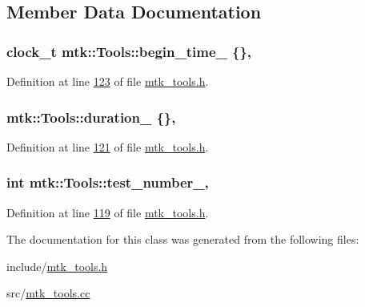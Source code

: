 \subsection{Member Data Documentation}
\hypertarget{classmtk_1_1Tools_a4bd58d08397db42271ed9e2d3ecc9963}{
\subsubsection[{begin\+\_\+time\+\_\+}]{\setlength{\rightskip}{0pt plus 5cm}clock\+\_\+t mtk\+::\+Tools\+::begin\+\_\+time\+\_\+ \{\}\hspace{0.3cm}{\ttfamily [static]}, {\ttfamily [private]}}}\label{classmtk_1_1Tools_a4bd58d08397db42271ed9e2d3ecc9963}


Definition at line \hyperlink{mtk__tools_8h_source_l00123}{123} of file \hyperlink{mtk__tools_8h_source}{mtk\+\_\+tools.\+h}.

\hypertarget{classmtk_1_1Tools_aba9d3d2952a3de9e7b46faa86d28d692}{
\subsubsection[{duration\+\_\+}]{ mtk\+::\+Tools\+::duration\+\_\+ \{\}\hspace{0.3cm}{\ttfamily [static]}, {\ttfamily [private]}}}\label{classmtk_1_1Tools_aba9d3d2952a3de9e7b46faa86d28d692}


Definition at line \hyperlink{mtk__tools_8h_source_l00121}{121} of file \hyperlink{mtk__tools_8h_source}{mtk\+\_\+tools.\+h}.

\hypertarget{classmtk_1_1Tools_a04a60458594336ee1badff79b8a9a77f}{
\subsubsection[{test\+\_\+number\+\_\+}]{\setlength{\rightskip}{0pt plus 5cm}int mtk\+::\+Tools\+::test\+\_\+number\+\_\+\hspace{0.3cm}{\ttfamily [static]}, {\ttfamily [private]}}}\label{classmtk_1_1Tools_a04a60458594336ee1badff79b8a9a77f}


Definition at line \hyperlink{mtk__tools_8h_source_l00119}{119} of file \hyperlink{mtk__tools_8h_source}{mtk\+\_\+tools.\+h}.



The documentation for this class was generated from the following files\+:\begin{DoxyCompactItemize}
\item 
include/\hyperlink{mtk__tools_8h}{mtk\+\_\+tools.\+h}\item 
src/\hyperlink{mtk__tools_8cc}{mtk\+\_\+tools.\+cc}\end{DoxyCompactItemize}
